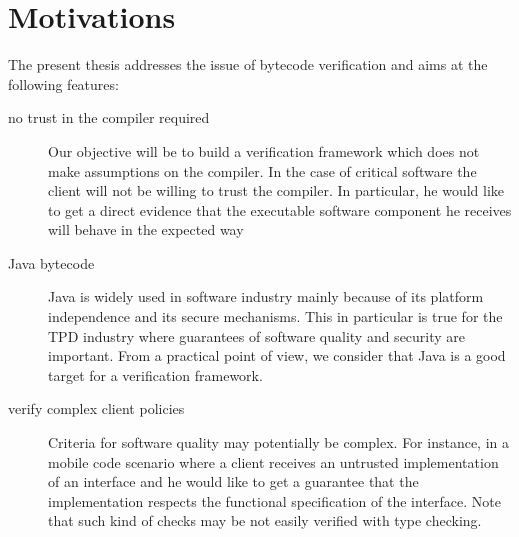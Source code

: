 \section{Motivations}

The present thesis addresses the issue of bytecode verification and aims at the following features:
\begin{description}
   \item [no trust in the compiler required] 
         Our objective will be to build a verification framework which does not make assumptions on the compiler.
         In the case of critical software the client will not be willing to trust the compiler. In particular, he would like
         to get a direct evidence that the executable software component  he receives will behave in the expected way 
   \item [Java bytecode] 
         Java is widely used  in software industry mainly because of its platform independence and its secure mechanisms.
	 This in particular is true for the TPD industry where guarantees of software quality and security are 
	 important. From a practical point of view, we consider that Java is a  good target for a verification framework.
   \item [verify complex client policies]
         Criteria for software quality may potentially be complex. For instance, in a mobile code 
	 scenario where a client receives an untrusted implementation of an interface and he would like to get a guarantee
	 that the implementation respects the functional specification of the interface. Note that such kind of checks may be not easily verified
	 with type checking.
	 

\end{description}



